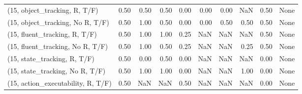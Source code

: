 \begin{table*}[h!]
\begin{adjustbox}{width=2\columnwidth,center}
\begin{tabular}{lrrr|rrr|rrr}
\midrule
(15, object\_tracking, R, T/F)         &                      0.50 &                  0.50 &                      0.50 &                          0.00 &                      0.00 &                          0.00 &                                    NaN &                               0.50 &                                  None \\
(15, object\_tracking, No R, T/F)      &                      0.50 &                  1.00 &                      0.50 &                          0.00 &                      0.00 &                          0.50 &                                   0.50 &                               0.50 &                                  None \\
(15, fluent\_tracking, R, T/F)         &                      0.50 &                  1.00 &                      1.00 &                          0.25 &                       NaN &                           NaN &                                    NaN &                               0.50 &                                  None \\
(15, fluent\_tracking, No R, T/F)      &                      0.50 &                  1.00 &                      0.50 &                          0.25 &                       NaN &                           NaN &                                   0.25 &                               0.50 &                                  None \\
(15, state\_tracking, R, T/F)          &                      0.50 &                  0.00 &                      0.50 &                          0.00 &                       NaN &                           NaN &                                    NaN &                               0.00 &                                  None \\
(15, state\_tracking, No R, T/F)       &                      0.50 &                  1.00 &                      1.00 &                          0.00 &                       NaN &                           NaN &                                   1.00 &                               0.00 &                                  None \\
(15, action\_executability, R, T/F)    &                      0.50 &                   NaN &                       NaN &                          0.50 &                       NaN &                           NaN &                                    NaN &                               0.00 &                                  None \\

\end{tabular}
\end{adjustbox}
\end{table*}
